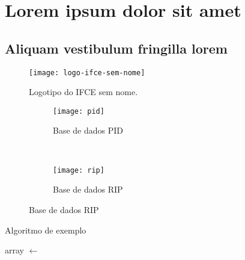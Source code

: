 \chapter{Lorem ipsum dolor sit amet}\label{cap:exampleChapter}
\section{Aliquam vestibulum fringilla lorem}

\lipsum[1]

\begin{figure}[H]
    \begin{center}
      \label{fig:1}
      \caption{Logotipo do IFCE sem nome.}
      \texttt{[image: logo-ifce-sem-nome]}
      \newline
    \end{center}
  \end{figure}

\lipsum[2-3]


\lipsum[2-3]
\begin{figure}
    \centering
    \caption{Exemplo de gráfico}\label{fig:animals}
    \begin{subfigure}[b]{0.45\textwidth}
        \texttt{[image: pid]}
        \caption{Base de dados PID}
        \label{fig:pid}
    \end{subfigure}
    ~
    \begin{subfigure}[b]{0.45\textwidth}
        \texttt{[image: rip]}
        \caption{Base de dados RIP}
        \label{fig:rip}
    \end{subfigure}
      \newline
\end{figure}


\lipsum[2]

\begin{algorithm}
\caption{Algoritmo de exemplo}\label{bogosort}
  \begin{algorithmic}[1]
    \State array $\gets$  
    \EndWhile
  \EndProcedure
  \end{algorithmic}
\end{algorithm}

\lipsum[1]